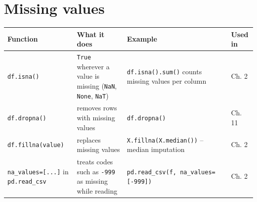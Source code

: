 \documentclass[
  letterpaper,
  DIV=11,
  numbers=noendperiod]{scrreprt}
\begin{document}
\section{Missing values}\label{missing-values}

\begin{longtable}[]{@{}
  >{\raggedright\arraybackslash}p{}
  >{\raggedright\arraybackslash}p{}
  >{\raggedright\arraybackslash}p{}
  >{\raggedright\arraybackslash}p{}@{}}
\toprule\noalign{}
\begin{minipage}[b]{\linewidth}\raggedright
Function
\end{minipage} & \begin{minipage}[b]{\linewidth}\raggedright
What it does
\end{minipage} & \begin{minipage}[b]{\linewidth}\raggedright
Example
\end{minipage} & \begin{minipage}[b]{\linewidth}\raggedright
Used in
\end{minipage} \\
\midrule\noalign{}
\endhead
\bottomrule\noalign{}
\endlastfoot
\texttt{df.isna()} & \texttt{True} wherever a value is missing
(\texttt{NaN}, \texttt{None}, \texttt{NaT}) & \texttt{df.isna().sum()}
counts missing values per column & Ch. 2 \\
\texttt{df.dropna()} & removes rows with missing values &
\texttt{df.dropna()} & Ch. 11 \\
\texttt{df.fillna(value)} & replaces missing values &
\texttt{X.fillna(X.median())} -- median imputation & Ch. 2 \\
\texttt{na\_values={[}...{]}} in \texttt{pd.read\_csv} & treats codes
such as \texttt{-999} as missing while reading &
\texttt{pd.read\_csv(f,\ na\_values={[}-999{]})} & Ch. 2 \\
\end{longtable}
\end{document}
